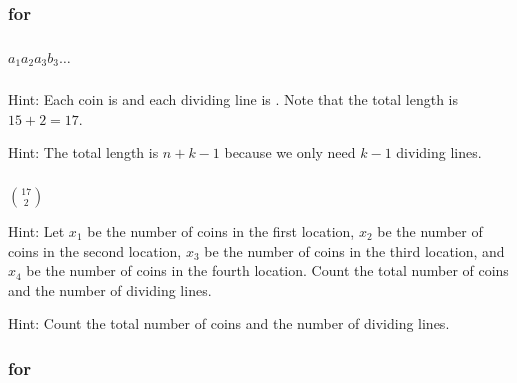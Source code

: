 \subsubsection{\answers for  \subrephrasingsubset}

\subsubsection*{ \answers}
\begin{apart}
    \item {}
    \item $a_1a_2a_3b_3\ldots$
\end{apart}

\subsubsection*{ \answers}
\begin{apart}
    \item Hint: Each coin is  and each dividing line is .  Note that the total length is $15+2=17$.
    \item Hint: The total length is $n+k-1$ because we only need $k-1$ dividing lines.
\end{apart}

\subsubsection*{ \answers}
\begin{apart}
    \item $\binom{17}{2}$
    \item Hint: Let $x_1$ be the number of coins in the first location, $x_2$ be the number of coins in the second location, $x_3$ be the number of coins in the third location, and $x_4$ be the number of coins in the fourth location. Count the total number of coins and the number of dividing lines.
    \item Hint: Count the total number of coins and the number of dividing lines.
\end{apart}

\subsubsection{\answers for  \subexplog}

